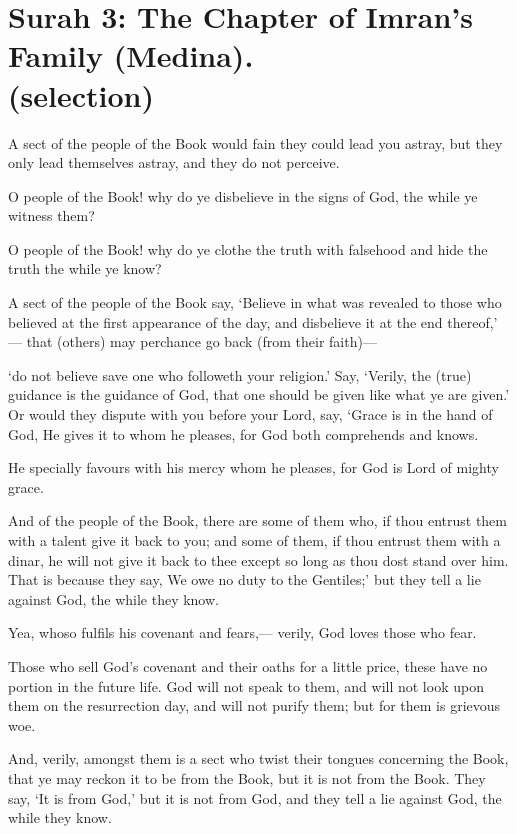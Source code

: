\documentclass[fontsize=14pt, letterpaper, notitlepage, openany, DIV=12]{scrbook} %
\begin{document}
\section[Surah 3: The Chapter of Imran's Family (Medina).]{Surah 3: The Chapter of Imran's Family (Medina).\\ (selection)}


\noindent[3:69]
A sect of the people of the Book would fain they could lead you astray, but they only lead
themselves astray, and they do not perceive.

\noindent[3:70]
O people of the Book! why do ye disbelieve in the signs of God, the while ye witness
them?

\noindent[3:71]
O people of the Book! why do ye clothe the truth with falsehood and hide the truth the
while ye know?

\noindent[3:72]
A sect of the people of the Book say, `Believe in what was revealed to those who
believed at the first appearance of the day, and disbelieve it at the end thereof,' --- that (others)
may perchance go back (from their faith)---

\noindent[3:73]
`do not believe save one who followeth your religion.' Say, `Verily, the (true) guidance is
the guidance of God, that one should be given like what ye are given.' Or would they dispute
with you before your Lord, say, `Grace is in the hand of God, He gives it to whom he pleases, for
God both comprehends and knows.

\noindent[3:74]
He specially favours with his mercy whom he pleases, for God is Lord of mighty grace.

\noindent[3:75]
And of the people of the Book, there are some of them who, if thou entrust them with a
talent give it back to you; and some of them, if thou entrust them with a dinar, he will not give it
back to thee except so long as thou dost stand over him. That is because they say, We owe no
duty to the Gentiles;' but they tell a lie against God, the while they know.

\noindent[3:76]
Yea, whoso fulfils his covenant and fears,--- verily, God loves those who fear.

\noindent[3:77]
Those who sell God's covenant and their oaths for a little price, these have no portion in
the future life. God will not speak to them, and will not look upon them on the resurrection day,
and will not purify them; but for them is grievous woe.

\noindent[3:78]
And, verily, amongst them is a sect who twist their tongues concerning the Book, that ye
may reckon it to be from the Book, but it is not from the Book. They say, `It is from God,' but it
is not from God, and they tell a lie against God, the while they know.
\end{document}
